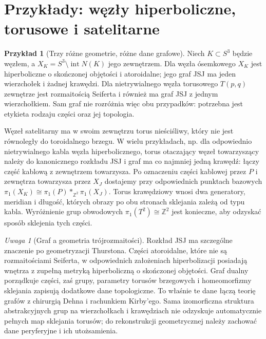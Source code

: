 \documentclass[11pt,a4paper]{report}
\numberwithin{equation}{section}
\theoremstyle{plain}
\theoremstyle{definition}
\newtheorem{przyklad}[twierdzenie]{Przykład}
\theoremstyle{remark}
\newtheorem{uwaga}[twierdzenie]{Uwaga}
\begin{document}
\section{Przykłady: węzły hiperboliczne, torusowe i satelitarne}
\label{sec:tg-jsj-knots}

\begin{przyklad}[Trzy różne geometrie, różne dane grafowe]
Niech $K\subset S^3$ będzie węzłem, a
$X_K=S^3\setminus\operatorname{int}N(K)$ jego
zewnętrzem. Dla węzła ósemkowego $X_K$ jest
hiperboliczne o skończonej objętości i atoroidalne;
jego graf JSJ ma jeden wierzchołek i żadnej krawędzi.
Dla nietrywialnego węzła torusowego $T(p,q)$
zewnętrze jest rozmaitością Seiferta i również
ma graf JSJ z jednym wierzchołkiem. Sam graf nie
rozróżnia więc obu przypadków: potrzebna jest
etykieta rodzaju części oraz jej topologia.

Węzeł satelitarny ma w swoim zewnętrzu torus nieściśliwy,
który nie jest równoległy do toroidalnego brzegu.
W wielu przykładach, np. dla odpowiednio
nietrywialnego kabla węzła hiperbolicznego,
torus otaczający węzeł towarzyszący należy do
kanonicznego rozkładu JSJ i graf ma co najmniej jedną
krawędź: łączy część kablową z zewnętrzem
towarzysza. Po oznaczeniu części kablowej przez $P$
i zewnętrza towarzysza przez $X_J$ dostajemy przy
odpowiednich punktach bazowych
$\pi_1(X_K)\cong\pi_1(P)*_{\mathbb Z^2}\pi_1(X_J)$.
Torus krawędziowy wnosi dwa generatory, meridian i długość,
których obrazy po obu stronach sklejania zależą od typu kabla. Wyróżnienie grup obwodowych
$\pi_1(T^2)\cong\mathbb Z^2$ jest konieczne,
aby odzyskać sposób sklejenia tych części.
\end{przyklad}

\begin{uwaga}[Graf a geometria trójrozmaitości]
Rozkład JSJ ma szczególne znaczenie po
geometryzacji Thurstona. Części atoroidalne,
które nie są rozmaitościami Seiferta, w
odpowiednich założeniach hiperbolizacji
posiadają wnętrza z zupełną metryką
hiperboliczną o skończonej objętości.
Graf dualny porządkuje części, zaś grupy,
parametry torusów brzegowych i homeomorfizmy
sklejania zapisują dodatkowe dane topologiczne.
To właśnie te dane łączą teorię grafów z
chirurgią Dehna i rachunkiem Kirby'ego. Sama
izomorficzna struktura abstrakcyjnych grup na wierzchołkach
i krawędziach nie odzyskuje automatycznie pełnych map
sklejania torusów; do rekonstrukcji geometrycznej
należy zachować dane peryferyjne i ich utożsamienia.
\end{uwaga}
\end{document}

